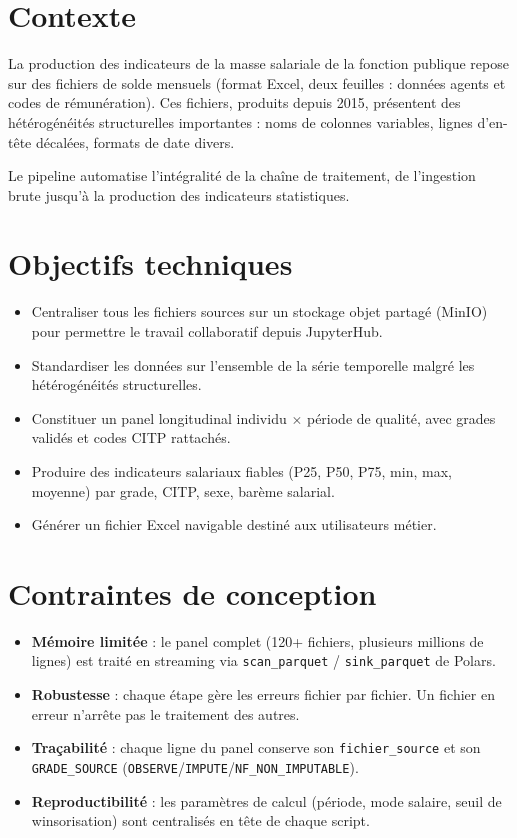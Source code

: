\documentclass[12pt,a4paper,french]{report}
\newcommand{\colname}[1]{\texttt{#1}}
\begin{document}
\section{Contexte}

La production des indicateurs de la masse salariale de la fonction publique
repose sur des fichiers de solde mensuels (format Excel, deux feuilles :
données agents et codes de rémunération). Ces fichiers, produits depuis 2015,
présentent des hétérogénéités structurelles importantes : noms de colonnes
variables, lignes d'en-tête décalées, formats de date divers.

Le pipeline automatise l'intégralité de la chaîne de traitement, de
l'ingestion brute jusqu'à la production des indicateurs statistiques.

\section{Objectifs techniques}

\begin{itemize}
  \item Centraliser tous les fichiers sources sur un stockage objet partagé
        (MinIO) pour permettre le travail collaboratif depuis JupyterHub.
  \item Standardiser les données sur l'ensemble de la série temporelle malgré
        les hétérogénéités structurelles.
  \item Constituer un panel longitudinal individu $\times$ période de qualité,
        avec grades validés et codes CITP rattachés.
  \item Produire des indicateurs salariaux fiables (P25, P50, P75, min, max,
        moyenne) par grade, CITP, sexe, barème salarial.
  \item Générer un fichier Excel navigable destiné aux utilisateurs métier.
\end{itemize}

\section{Contraintes de conception}

\begin{itemize}
  \item \textbf{Mémoire limitée} : le panel complet (120+ fichiers, plusieurs
        millions de lignes) est traité en streaming via
        \texttt{scan\_parquet} / \texttt{sink\_parquet} de Polars.
  \item \textbf{Robustesse} : chaque étape gère les erreurs fichier par fichier.
        Un fichier en erreur n'arrête pas le traitement des autres.
  \item \textbf{Traçabilité} : chaque ligne du panel conserve son
        \colname{fichier\_source} et son \colname{GRADE\_SOURCE}
        (\texttt{OBSERVE}/\texttt{IMPUTE}/\texttt{NF\_NON\_IMPUTABLE}).
  \item \textbf{Reproductibilité} : les paramètres de calcul (période, mode
        salaire, seuil de winsorisation) sont centralisés en tête de chaque
        script.
\end{itemize}
\end{document}
